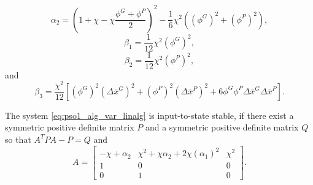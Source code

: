\begin{equation}
\label{eq:def_param_alpha2}
\alpha_{2} = (1 + \chi - \chi \frac{ \phi^{G} + \phi^{P} }{ 2 } )^{2} - \frac{1}{6} \chi^{2} ( ( \phi^{G} )^{2} + ( \phi^{P} )^{2} ),
\end{equation}
\begin{equation}
\label{eq:def_param_beta1}
\beta_{1} = \frac{1}{12} \chi^{2} ( \phi^{G} )^{2},
\end{equation}
\begin{equation}
\label{eq:def_param_beta2}
\beta_{2} = \frac{1}{12} \chi^{2} ( \phi^{P} )^{2},
\end{equation}
and
\begin{equation}
\label{eq:def_param_beta3}
\beta_{3} = \frac{ \chi^{2} }{ 12 } [ (\phi^{G})^{2} (\Delta \bar{x}^{G} )^{2} + (\phi^{P})^{2} (\Delta \bar{x}^{P} )^{2} + 6 \phi^{G} \phi^{P} \Delta \bar{x}^{G} \Delta \bar{x}^{P} ].
\end{equation}

\begin{mythm}
The system \eqref{eq:pso1_alg_var_linalg} is input-to-state stable, if there exist a symmetric positive definite matrix $ P $ and a symmetric positive definite matrix $ Q $ so that
$ A^{T} P A - P = Q $ and
\begin{equation}
A = 
\begin{bmatrix}
- \chi + \alpha_{2}  &  \chi^{2} + \chi \alpha_{2} + 2 \chi ( \alpha_{1} )^{2}  & \chi^{2} \\
1 & 0 & 0 \\
0 & 1 & 0
\end{bmatrix}.
\end{equation}
\end{mythm}